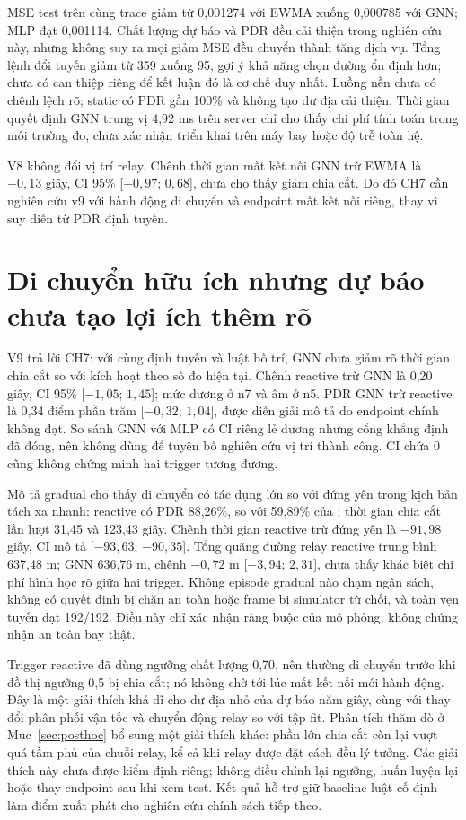 \documentclass[12pt,a4paper]{report}
\newcommand{\code}[1]{\texttt{\detokenize{#1}}}
\begin{document}
MSE test trên cùng trace giảm từ 0,001274 với EWMA xuống 0,000785 với GNN;
MLP đạt 0,001114. Chất lượng dự báo và PDR đều cải thiện trong nghiên cứu này,
nhưng không suy ra mọi giảm MSE đều chuyển thành tăng dịch vụ. Tổng lệnh đổi
tuyến giảm từ 359 xuống 95, gợi ý khả năng chọn đường ổn định hơn; chưa có
can thiệp riêng để kết luận đó là cơ chế duy nhất. Luồng nền chưa có chênh
lệch rõ; static có PDR gần 100\% và không tạo dư địa cải thiện. Thời gian
quyết định GNN trung vị 4,92 ms trên server chỉ cho thấy chi phí tính toán
trong môi trường đo, chưa xác nhận triển khai trên máy bay hoặc độ trễ toàn hệ.

V8 không đổi vị trí relay. Chênh thời gian mất kết nối GNN trừ EWMA là
$-0{,}13$ giây, CI 95\% [$-0{,}97$; $0{,}68$], chưa cho thấy giảm chia cắt.
Do đó CH7 cần nghiên cứu v9 với hành động di chuyển và endpoint mất kết nối
riêng, thay vì suy diễn từ PDR định tuyến.

\section{Di chuyển hữu ích nhưng dự báo chưa tạo lợi ích thêm rõ}
V9 trả lời CH7: với cùng định tuyến và luật bố trí, GNN chưa giảm rõ thời
gian chia cắt so với kích hoạt theo số đo hiện tại. Chênh reactive trừ GNN
là 0,20 giây, CI 95\% [$-1{,}05$; $1{,}45$]; mức dương ở n7 và âm ở n5.
PDR GNN trừ reactive là 0,34 điểm phần trăm [$-0{,}32$; $1{,}04$], được
diễn giải mô tả do endpoint chính không đạt. So sánh GNN với MLP có CI riêng
lẻ dương nhưng cổng khẳng định đã đóng, nên không dùng để tuyên bố nghiên
cứu vị trí thành công. CI chứa 0 cũng không chứng minh hai trigger tương đương.

Mô tả gradual cho thấy di chuyển có tác dụng lớn so với đứng yên trong
kịch bản tách xa nhanh: reactive có PDR 88,26\%, so với 59,89\% của
\code{route-only}; thời gian chia cắt lần lượt 31,45 và 123,43 giây. Chênh
thời gian reactive trừ đứng yên là $-91{,}98$ giây, CI mô tả
[$-93{,}63$; $-90{,}35$]. Tổng quãng đường relay reactive trung bình
637,48 m; GNN 636,76 m, chênh $-0{,}72$ m [$-3{,}94$; $2{,}31$], chưa
thấy khác biệt chi phí hình học rõ giữa hai trigger. Không episode gradual
nào chạm ngân sách, không có quyết định bị chặn an toàn hoặc frame bị
simulator từ chối, và toàn vẹn tuyến đạt 192/192. Điều này chỉ xác nhận
ràng buộc của mô phỏng, không chứng nhận an toàn bay thật.

Trigger reactive đã dùng ngưỡng chất lượng 0,70, nên thường di chuyển trước
khi đồ thị ngưỡng 0,5 bị chia cắt; nó không chờ tới lúc mất kết nối mới
hành động. Đây là một giải thích khả dĩ cho dư địa nhỏ của dự báo năm giây,
cùng với thay đổi phân phối vận tốc và chuyển động relay so với tập fit.
Phân tích thăm dò ở Mục~\ref{sec:posthoc} bổ sung một giải thích khác:
phần lớn chia cắt còn lại vượt quá tầm phủ của chuỗi relay, kể cả khi relay
được đặt cách đều lý tưởng.
Các giải thích này chưa được kiểm định riêng; không điều chỉnh lại ngưỡng,
huấn luyện lại hoặc thay endpoint sau khi xem test. Kết quả hỗ trợ giữ
baseline luật cố định làm điểm xuất phát cho nghiên cứu chính sách tiếp theo.
\end{document}
